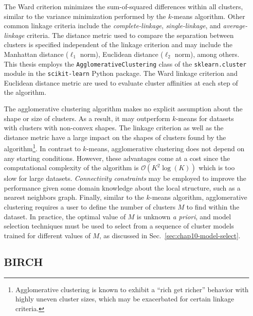 The Ward criterion minimizes the sum-of-squared differences within all clusters, similar to the variance minimization performed by the $k$-means algorithm. Other common linkage criteria include the \textit{complete-linkage}, \textit{single-linkage}, and \textit{average-linkage} criteria. The distance metric used to compare the separation between clusters is specified independent of the linkage criterion and may include the Manhattan distance ($\ell_{1}$ norm), Euclidean distance ($\ell_{2}$ norm), among others. This thesis employs the \texttt{AgglomerativeClustering} class of the \texttt{sklearn.cluster} module in the \texttt{scikit-learn} Python package. The Ward linkage criterion and Euclidean distance metric are used to evaluate cluster affinities at each step of the algorithm.

The agglomerative clustering algorithm makes no explicit assumption about the shape or size of clusters. As a result, it may outperform $k$-means for datasets with clusters with non-convex shapes. The linkage criterion as well as the distance metric have a large impact on the shapes of clusters found by the algorithm\footnote{Agglomerative clustering is known to exhibit a ``rich get richer'' behavior with highly uneven cluster sizes, which may be exacerbated for certain linkage criteria.}. In contrast to $k$-means, agglomerative clustering does not depend on any starting conditions. However, these advantages come at a cost since the computational complexity of the algorithm is $\mathcal{O}(K^{2}\log(K))$ which is too slow for large datasets. \textit{Connectivity constraints} may be employed to improve the performance given some domain knowledge about the local structure, such as a nearest neighbors graph. Finally, similar to the $k$-means algorithm, agglomerative clustering requires a user to define the number of clusters $M$ to find within the dataset. In practice, the optimal value of $M$ is unknown \textit{a priori}, and model selection techniques must be used to select from a sequence of cluster models trained for different values of $M$, as discussed in Sec.~\ref{sec:chap10-model-select}.

\subsection{BIRCH}
\label{subsec:chap10-birch}


